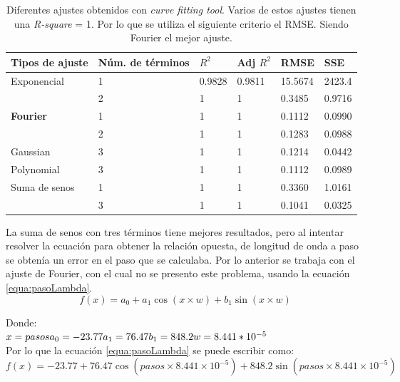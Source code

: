  \begin{table} [h]
\centering
\caption{Diferentes ajustes obtenidos con \textit{curve fitting tool}. Varios de estos ajustes tienen una \textit{R-square} = 1. Por lo que se utiliza el siguiente criterio el RMSE. Siendo Fourier el mejor ajuste.}
\label{tabla:ajustes}
\begin{tabular}{|p{30mm}|p{30mm}|p{10mm}|p{12mm}|p{12mm}|p{12mm}|}
	\hline 
	Tipos de ajuste&Núm. de términos & $R^{2}$ & Adj $R^{2}$& RMSE & SSE \\ 
	\hline 
	Exponencial  & 1 & 0.9828 & 0.9811 & 15.5674 & 2423.4 \\ 
	\hline 
	& 2 & 1& 1 & 0.3485 & 0.9716 \\ 
	\hline 
	\textbf{Fourier} & 1 & 1 & 1 & 0.1112 & 0.0990 \\ 
	\hline 
	& 2 & 1 & 1 & 0.1283 & 0.0988 \\ 
	\hline 
	Gaussian & 3 & 1 & 1 & 0.1214 & 0.0442 \\ 	\hline 
	Polynomial & 3 & 1 & 1 & 0.1112 & 0.0989 \\ 
	\hline 
	Suma de senos & 1 & 1 & 1 & 0.3360 & 1.0161 \\ 
	\hline 
	& 3 & 1 & 1 & 0.1041 & 0.0325 \\ 
	\hline 
\end{tabular} 

\end{table}
La suma de senos con tres términos tiene mejores resultados, pero al intentar resolver la ecuación para obtener la relación opuesta, de longitud de onda a paso se obtenía un error en el paso que se calculaba. Por lo anterior se trabaja con el ajuste de Fourier, con el cual no se presento este problema, usando la ecuación \ref{equa:pasoLambda}.
\begin{equation}
f(x) = a_0 + a_1\cos (x\times w) + b_1 \sin(x \times w)
\label{equa:pasoLambda}
\end{equation}

Donde: \\
$x = pasos\\
a_0 =-23.77\\
a_1 = 76.47 \\  %
b_1 = 848.2 \\  %
w = 8.441*10^{-5}$\\  %
Por lo que la ecuación \ref{equa:pasoLambda} se puede escribir como:\\
\begin{equation}
f(x) =-23.77+76.47 \cos(pasos \times8.441\times10^{-5}) +848.2 \sin(pasos \times8.441\times10^{-5})
\label{equa:pasoLambda2}
\end{equation}

